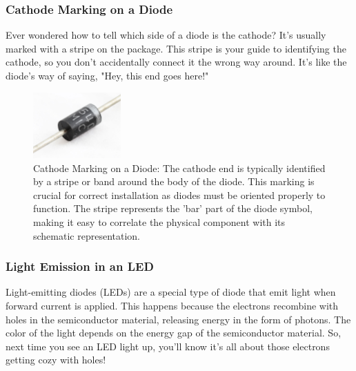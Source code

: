 \subsubsection*{Cathode Marking on a Diode}
Ever wondered how to tell which side of a diode is the cathode? It's usually marked with a stripe on the package. This stripe is your guide to identifying the cathode, so you don't accidentally connect it the wrong way around. It's like the diode's way of saying, "Hey, this end goes here!"

\begin{figure}[th]
    \centering
    \includegraphics[width=0.3\textwidth]{images/diode.jpeg}
    \caption{Cathode Marking on a Diode: The cathode end is typically identified by a stripe or band around the body of the diode. This marking is crucial for correct installation as diodes must be oriented properly to function. The stripe represents the 'bar' part of the diode symbol, making it easy to correlate the physical component with its schematic representation.}
    \label{fig:cathode_marking}
\end{figure}

\subsubsection*{Light Emission in an LED}
Light-emitting diodes (LEDs) are a special type of diode that emit light when forward current is applied. This happens because the electrons recombine with holes in the semiconductor material, releasing energy in the form of photons. The color of the light depends on the energy gap of the semiconductor material. So, next time you see an LED light up, you'll know it's all about those electrons getting cozy with holes!

